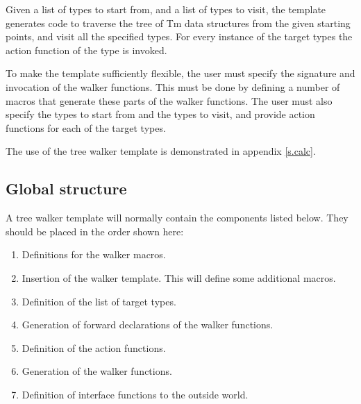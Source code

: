 Given a list of types to start from, and a list of types to visit,
the template generates code to traverse the tree of Tm data structures
from the given starting points, and visit all the specified types.
For every instance of the target types the action function of the
type is invoked.

To make the template sufficiently flexible, the user must specify
the signature and invocation of the walker functions. This must be
done by defining a number of macros that generate these parts of
the walker functions. The user must also specify the types to
start from and the types to visit, and provide action functions for
each of the target types.

The use of the tree walker template is demonstrated in appendix \ref{s.calc}.

\subsection{Global structure}
A tree walker template will normally contain the components listed below.
They should be placed in the order shown here:
\begin{enumerate}
\item Definitions for the walker macros.
\item Insertion of the walker template. This will define some
 additional macros.
\item Definition of the list of target types.
\item Generation of forward declarations of the walker functions.
\item Definition of the action functions.
\item Generation of the walker functions.
\item Definition of interface functions to the outside world.
\end{enumerate}
